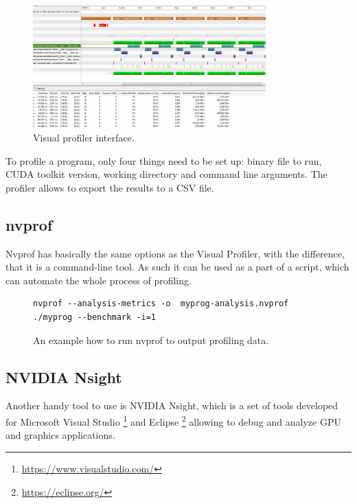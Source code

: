 \begin{figure}[ht]
	\begin{center}
	\includegraphics[width=0.8\textwidth]{fig/visual_profiler.jpg}
	\caption{Visual profiler interface.}
	\label{fig:visual-profiler}
	\end{center}
\end{figure}


To profile a program, only four things need to be set up: binary file to run, CUDA toolkit version, working directory and command line arguments. The profiler allows to export the results to a CSV file.

\subsection{nvprof}\label{subsec:proftools-nvprof}

Nvprof has basically the same options as the Visual Profiler, with the difference, that it is a command-line tool. As such it can be used as a part of a script, which can automate the whole process of profiling.

\begin{figure}
\begin{verbatim}
nvprof --analysis-metrics -o  myprog-analysis.nvprof ./myprog --benchmark -i=1
\end{verbatim}
\caption{An example how to run nvprof to output profiling data.}
\end{figure}

\subsection{NVIDIA Nsight}\label{subsec:proftools-nsight}

Another handy tool to use is NVIDIA Nsight, which is a set of tools developed for Microsoft Visual Studio \footnote{\url{https://www.visualstudio.com/}} and Eclipse \footnote{\url{https://eclipse.org/}} allowing to debug and analyze GPU and graphics applications.

